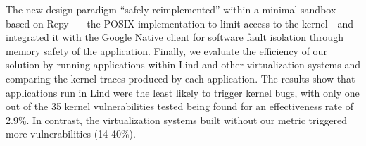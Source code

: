 
The new design paradigm ``safely-reimplemented'' within a minimal sandbox based
 on Repy ~\cite{Repy-10} - the POSIX implementation
to limit access to the kernel - and  integrated it with the Google Native client
for software fault isolation through memory safety of the application.
Finally, we evaluate the efficiency of our solution by running applications
within Lind and other virtualization systems
and comparing the kernel traces produced by each application.
The results show that applications run in Lind were the least likely to trigger
kernel bugs,
with only one out of the 35 kernel vulnerabilities tested being found for an
effectiveness rate of 2.9\%.
In contrast, the virtualization systems built without our metric triggered
 more vulnerabilities (14-40\%).


